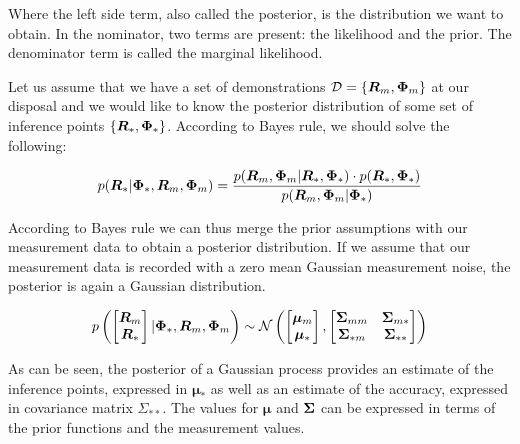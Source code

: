 \documentclass[mscThesis.tex]{subfiles}
\begin{document}
Where the left side term, also called the posterior, is the distribution we want to obtain. In the nominator, two terms are present: the likelihood and the prior. The denominator term is called the marginal likelihood. 

Let us assume that we have a set of demonstrations $\mathcal{D}=\{\bm{R}_m, \mathbf{\Phi}_m\}$ at our disposal and we would like to know the posterior distribution of some set of inference points $\{\bm{R}_{*}, \mathbf{\Phi}_{*}\}$. According to Bayes rule, we should solve the following: 

\begin{equation*}
p(\bm{R}_{*} | \mathbf{\Phi}_{*}, \bm{R}_m, \mathbf{\Phi}_m) = \frac{p(\bm{R}_m, \mathbf{\Phi}_m | \bm{R}_{*}, \mathbf{\Phi}_{*}) \cdot p(\bm{R}_{*}, \mathbf{\Phi}_{*})}{p(\bm{R}_m, \mathbf{\Phi}_m | \mathbf{\Phi}_{*})}
\end{equation*}

According to Bayes rule we can thus merge the prior assumptions with our measurement data to obtain a posterior distribution. If we assume that our measurement data is recorded with a zero mean Gaussian measurement noise, the posterior is again a Gaussian distribution.

\begin{equation*}
p \left( 
\begin{bmatrix}
\bm{R}_m \\ \bm{R}_{*}
\end{bmatrix} 
| \mathbf{\Phi}_{*}, \bm{R}_m, \mathbf{\Phi}_m 
\right)
\sim
\mathcal{N}
\left(
\begin{bmatrix}
\bm{\mu}_m \\ \bm{\mu}_{*}
\end{bmatrix}
, 
\begin{bmatrix}
\mathbf{\Sigma}_{mm} & \mathbf{\Sigma}_{m*} \\ \mathbf{\Sigma}_{*m} & \mathbf{\Sigma}_{**}
\end{bmatrix}
\right)
\end{equation*}

As can be seen, the posterior of a Gaussian process provides an estimate of the inference points, expressed in $\bm{\mu}_{*}$ as well as an estimate of the accuracy, expressed in covariance matrix $\Sigma_{**}$. The values for $\bm{\mu}$ and $\mathbf{\Sigma}$ can be expressed in terms of the prior functions and the measurement values.
\end{document}
